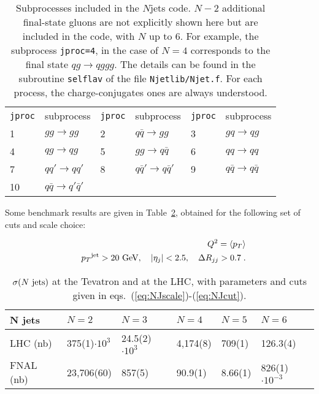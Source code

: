 \documentclass[paper]{JHEP3}
\newcommand{\gev}{\mbox{GeV}}
\newcommand{\ccaption}[2]{
    \begin{center}
    \parbox{0.85\textwidth}{
      \caption[#1]{\small{{#2}}}
      }
    \end{center}
    }
\def    \ba             {\begin{eqnarray}}
\def    \ea             {\end{eqnarray}}
\def    \gev            {\mbox{$\mathrm{GeV}$}}
\def    \qbar   {\bar{q}}
\def    \pt             {\mbox{$p_T$}}
\begin{document}
\begin{table}
\begin{center}
\begin{tabular}{ll|ll|ll}
{\tt jproc} & subprocess & {\tt jproc} & subprocess & {\tt jproc} &
subprocess \\ 
1 &  $g g \to  gg$ 
&2 &  $q \qbar \to gg$ 
&3 &  $g q \to  qg $ 
\\
4 & $ qg \to qg$
&5 &  $g g  \to   q \qbar$ 
&6 &  $q q   \to qq $ 
\\
7 &  $q q' \to q q'$ 
&8 &  $q\qbar' \to  q \qbar'$ 
&9 &  $q\qbar \to  q \qbar$ 
\\
10 &  $q\qbar \to  q' \qbar'$ 
 & & & &
\end{tabular}
\ccaption{}{\label{tab:Njets} Subprocesses included in the $N$jets
  code. $N-2$ additional final-state gluons are not explicitly 
  shown here but are included in the code, with $N$ up to 6.
  For example, the subprocess {\tt jproc=4},
  in the case of $N=4$ corresponds to the final state  
  $qg \to qggg$.
  The details can be found in the subroutine {\tt selflav} of
  the file {\tt Njetlib/Njet.f}. For each process, the charge-conjugates 
  ones are always understood.}
\end{center}
\end{table}

Some benchmark results are given in Table~\ref{tab:NJxs}, obtained
for the following set of cuts and scale choice:

\ba
\label{eq:NJscale}
&&Q^2=\langle \pt \rangle\\
&&\pt^{\rm jet}>20~\gev, \quad \vert \eta_j\vert < 2.5, \quad \Delta
        R_{jj} >0.7 \; .
\label{eq:NJcut}
\ea



\begin{table}
\begin{center}
\begin{tabular}{||l|l|l|l|l|l||}\hline
N jets & $N = 2$ & $N = 3$ & $N=4$ & $N=5$ & $N=6$ \\ 
\hline
LHC (nb)  & 375(1)$\cdot 10^3$ & 24.5(2)$\cdot 10^3$ 
& 4,174(8) & 709(1) & 126.3(4)\\ 
\hline
FNAL (nb) &  23,706(60) &  857(5) & 90.9(1) & 8.66(1) & 826(1)$\cdot 10^{-3}$ \\ 
\hline
\end{tabular}            
\ccaption{}{\label{tab:NJxs} $\sigma(N~{\rm jets})$
at the Tevatron and 
at the LHC, with parameters and cuts given in
eqs.~(\ref{eq:NJscale})-(\ref{eq:NJcut}). }
\end{center}
\end{table}
\end{document}
